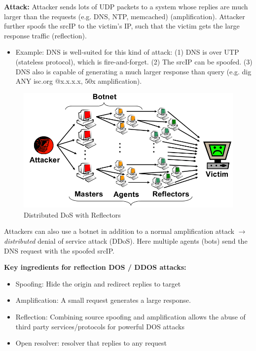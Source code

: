 \documentclass[11pt,oneside,a4paper]{article}
\begin{document}
\textbf{Attack:} Attacker sends lots of UDP packets to a system whose replies are much larger than the requests (e.g. DNS, NTP, memcached) (amplification). Attacker further spoofs the srcIP to the victim's IP, such that the victim gets the large response traffic (reflection).

\vspace{-\topsep}
\begin{itemize}
	\setlength{\itemsep}{0pt}
	\setlength{\parskip}{0pt}
	\item Example: DNS is well-suited for this kind of attack: (1) DNS is over UTP (stateless protocol), which is fire-and-forget. (2) The srcIP can be spoofed. (3) DNS also is capable of generating a much larger response than query (e.g. dig ANY isc.org @x.x.x.x, 50x amplification).
\end{itemize}
\vspace{-\topsep}

\begin{figure}
	\centering
	\includegraphics[width=0.4\linewidth]{figures/ddos_with_reflectors}
	\caption{Distributed DoS with Reflectors}
	\label{fig:ddoswithreflectors}
\end{figure}

Attackers can also use a botnet in addition to a normal amplification attack $\rightarrow$ \textit{distributed} denial of service attack (DDoS). Here multiple agents (bots) send the DNS request with the spoofed srcIP.

\newpage

\noindent\textbf{Key ingredients for reflection DOS / DDOS attacks:}

\vspace{-\topsep}
\begin{itemize}
	\setlength{\itemsep}{0pt}
	\setlength{\parskip}{0pt}
	\item Spoofing: Hide the origin and redirect replies to target
	\item Amplification: A small request generates a large response.
	\item Reflection: Combining source spoofing and amplification allows the 	abuse of third party services/protocols for powerful DOS attacks
	\item Open resolver: resolver that replies to any request
\end{itemize}
\vspace{-\topsep}
\end{document}
